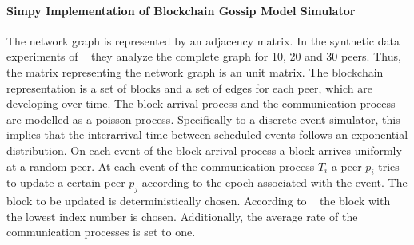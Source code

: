 \paragraph{Simpy Implementation of Blockchain Gossip Model Simulator}
The network graph is represented by an adjacency matrix. In the synthetic data experiments of \gopalan~  they analyze the complete graph for 10, 20 and 30 peers. Thus, the matrix representing the network graph is an unit matrix. 
The blockchain representation is a set of blocks and a set of edges for each peer, which are developing over time.
The block arrival process and the communication process are modelled as a poisson process. Specifically to a discrete event simulator, this implies that the interarrival time between scheduled events follows an exponential distribution. On each event of the block arrival process a block arrives uniformly at a random peer. At each event of the communication process $T_i$ a peer $p_i$ tries to update a certain peer $p_j$ according to the epoch associated with the event.
The block to be updated is deterministically chosen. According to \gopalan~ the block with the lowest index number is chosen. Additionally, the average rate of the communication processes is set to one.

